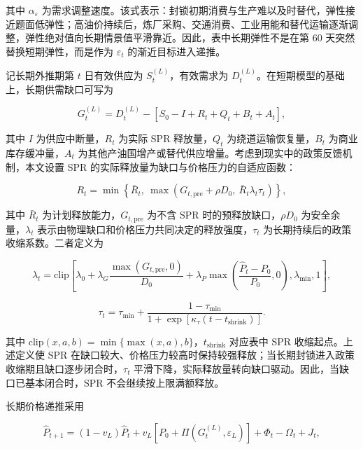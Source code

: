 其中 \(\alpha_\varepsilon\) 为需求调整速度。该式表示：封锁初期消费与生产难以及时替代，弹性接近题面低弹性；高油价持续后，炼厂采购、交通消费、工业用能和替代运输逐渐调整，弹性绝对值向长期情景值平滑靠近。因此，表中长期弹性不是在第 60 天突然替换短期弹性，而是作为 \(\varepsilon_t\) 的渐近目标进入递推。

记长期外推期第 $t$ 日有效供应为 $S_t^{(L)}$，有效需求为 $D_t^{(L)}$。在短期模型的基础上，长期供需缺口可写为

\begin{equation}
G_t^{(L)}
=
D_t^{(L)}
-
\left[
S_0-I+R_t+Q_t+B_t+A_t
\right],
\end{equation}

其中 $I$ 为供应中断量，$R_t$ 为实际 SPR 释放量，$Q_t$ 为绕道运输恢复量，$B_t$ 为商业库存缓冲量，$A_t$ 为其他产油国增产或替代供应增量。考虑到现实中的政策反馈机制，本文设置 SPR 的实际释放量为缺口与价格压力的自适应函数：

\begin{equation}
R_t=\min\left\{\bar R_t,\ \max\left(G_{t,\mathrm{pre}}+\rho D_0,\ \bar R_t \lambda_t \tau_t\right)\right\},
\end{equation}

其中 $\bar R_t$ 为计划释放能力，$G_{t,\mathrm{pre}}$ 为不含 SPR 时的预释放缺口，$\rho D_0$ 为安全余量，$\lambda_t$ 表示由物理缺口和价格压力共同决定的释放强度，$\tau_t$ 为长期持续后的政策收缩系数。二者定义为

\begin{equation}
\lambda_t
=
\mathrm{clip}\left[
\lambda_0
+\lambda_G\frac{\max(G_{t,\mathrm{pre}},0)}{D_0}
+\lambda_P\max\left(\frac{\hat P_t-P_0}{P_0},0\right),
\lambda_{\min},1
\right],
\end{equation}

\begin{equation}
\tau_t
=
\tau_{\min}
+
\frac{1-\tau_{\min}}
{1+\exp\left[\kappa_\tau(t-t_{\mathrm{shrink}})\right]} .
\end{equation}

其中 \(\mathrm{clip}(x,a,b)=\min\{\max(x,a),b\}\)，\(t_{\mathrm{shrink}}\) 对应表中 SPR 收缩起点。上述定义使 SPR 在缺口较大、价格压力较高时保持较强释放；当长期封锁进入政策收缩期且缺口逐步闭合时，\(\tau_t\) 平滑下降，实际释放量转向缺口驱动。因此，当缺口已基本闭合时，SPR 不会继续按上限满额释放。

长期价格递推采用

\begin{equation}
\hat P_{t+1}
=
(1-v_L)\hat P_t
+v_L
\left[
P_0+\Pi(G_t^{(L)},\varepsilon_L)
\right]
+\Phi_t-\Omega_t+J_t ,
\end{equation}

